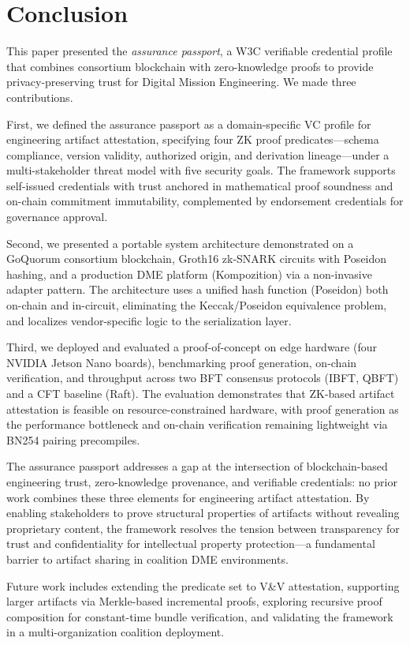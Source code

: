 \section{Conclusion}
\label{sec:conclusion}

This paper presented the \emph{assurance passport}, a W3C verifiable credential profile that combines consortium blockchain with zero-knowledge proofs to provide privacy-preserving trust for Digital Mission Engineering.
We made three contributions.

First, we defined the assurance passport as a domain-specific VC profile for engineering artifact attestation, specifying four ZK proof predicates---schema compliance, version validity, authorized origin, and derivation lineage---under a multi-stakeholder threat model with five security goals.
The framework supports self-issued credentials with trust anchored in mathematical proof soundness and on-chain commitment immutability, complemented by endorsement credentials for governance approval.

Second, we presented a portable system architecture demonstrated on a GoQuorum consortium blockchain, Groth16 zk-SNARK circuits with Poseidon hashing, and a production DME platform (Kompozition) via a non-invasive adapter pattern.
The architecture uses a unified hash function (Poseidon) both on-chain and in-circuit, eliminating the Keccak/Poseidon equivalence problem, and localizes vendor-specific logic to the serialization layer.

Third, we deployed and evaluated a proof-of-concept on edge hardware (four NVIDIA Jetson Nano boards), benchmarking proof generation, on-chain verification, and throughput across two BFT consensus protocols (IBFT, QBFT) and a CFT baseline (Raft).
The evaluation demonstrates that ZK-based artifact attestation is feasible on resource-constrained hardware, with proof generation as the performance bottleneck and on-chain verification remaining lightweight via BN254 pairing precompiles.

The assurance passport addresses a gap at the intersection of blockchain-based engineering trust, zero-knowledge provenance, and verifiable credentials: no prior work combines these three elements for engineering artifact attestation.
By enabling stakeholders to prove structural properties of artifacts without revealing proprietary content, the framework resolves the tension between transparency for trust and confidentiality for intellectual property protection---a fundamental barrier to artifact sharing in coalition DME environments.

Future work includes extending the predicate set to V\&V attestation, supporting larger artifacts via Merkle-based incremental proofs, exploring recursive proof composition for constant-time bundle verification, and validating the framework in a multi-organization coalition deployment.
